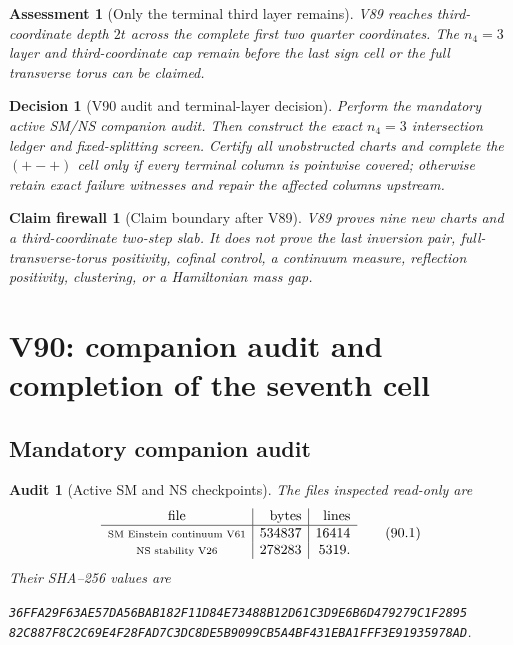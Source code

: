 \documentclass[11pt,oneside]{article}
\newtheorem{assessment}[theorem]{Assessment}
\newtheorem{firewall}[theorem]{Claim firewall}
\newtheorem{audit}[theorem]{Audit}
\newtheorem{decision}[theorem]{Decision}
\theoremstyle{definition}
\theoremstyle{remark}
\begin{document}
\begin{assessment}[Only the terminal third layer remains]
\label{ass:newv89}
V89 reaches third-coordinate depth \(2t\) across the complete first
two quarter coordinates.  The \(n_4=3\) layer and third-coordinate
cap remain before the last sign cell or the full transverse torus
can be claimed.
\end{assessment}

\begin{decision}[V90 audit and terminal-layer decision]
\label{dec:newv89-next}
Perform the mandatory active SM/NS companion audit.  Then construct
the exact \(n_4=3\) intersection ledger and fixed-splitting screen.
Certify all unobstructed charts and complete the \((+-+)\) cell only
if every terminal column is pointwise covered; otherwise retain exact
failure witnesses and repair the affected columns upstream.
\end{decision}

\begin{firewall}[Claim boundary after V89]
\label{fire:newv89-final}
V89 proves nine new charts and a third-coordinate two-step slab.  It
does not prove the last inversion pair, full-transverse-torus
positivity, cofinal control, a continuum measure, reflection
positivity, clustering, or a Hamiltonian mass gap.
\end{firewall}

\section{V90: companion audit and completion of the seventh cell}
\label{sec:newv90-seventh-cell}

\subsection{Mandatory companion audit}

\begin{audit}[Active SM and NS checkpoints]
\label{audit:newv90-companions}
The files inspected read-only are
\[
\begin{array}{c|r|r}
\text{file}&\text{bytes}&\text{lines}\\ \hline
\text{\scriptsize SM Einstein continuum V61}&534837&16414\\
\text{\scriptsize NS stability V26}&278283&5319.
\end{array}                                             \tag{90.1}
\]
Their SHA--256 values are
\begin{center}\scriptsize
\texttt{36FFA29F63AE57DA56BAB182F11D84E73488B12D61C3D9E6B6D479279C1F2895}\\
\texttt{82C887F8C2C69E4F28FAD7C3DC8DE5B9099CB5A4BF431EBA1FFF3E91935978AD}.
\end{center}
\end{audit}
\end{document}

